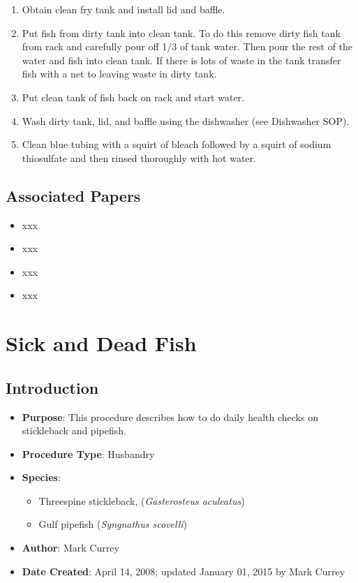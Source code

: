 \documentclass[
  letterpaper,
  DIV=11,
  numbers=noendperiod]{scrreprt}
\providecommand{\tightlist}{%
  \setlength{\itemsep}{0pt}\setlength{\parskip}{0pt}}\usepackage{longtable,booktabs,array}
\begin{document}
\begin{enumerate}
\def\labelenumi{\arabic{enumi}.}
\tightlist
\item
  Obtain clean fry tank and install lid and baffle.
\item
  Put fish from dirty tank into clean tank. To do this remove dirty fish
  tank from rack and carefully pour off 1/3 of tank water. Then pour the
  rest of the water and fish into clean tank. If there is lots of waste
  in the tank transfer fish with a net to leaving waste in dirty tank.
\item
  Put clean tank of fish back on rack and start water.
\item
  Wash dirty tank, lid, and baffle using the dishwasher (see Dishwasher
  SOP).
\item
  Clean blue tubing with a squirt of bleach followed by a squirt of
  sodium thiosulfate and then rinsed thoroughly with hot water.
\end{enumerate}

\hypertarget{associated-papers-6}{%
\section{Associated Papers}\label{associated-papers-6}}

\begin{itemize}
\tightlist
\item
  xxx
\item
  xxx
\item
  xxx
\item
  xxx
\end{itemize}

\hypertarget{sec-husbandry-fish_health_check}{%
\chapter{Sick and Dead Fish}\label{sec-husbandry-fish_health_check}}

\hypertarget{introduction-13}{%
\section{Introduction}\label{introduction-13}}

\begin{itemize}
\tightlist
\item
  \textbf{Purpose}: This procedure describes how to do daily health
  checks on stickleback and pipefish.
\item
  \textbf{Procedure Type}: Husbandry
\item
  \textbf{Species}:

  \begin{itemize}
  \tightlist
  \item
    Threespine stickleback, (\emph{Gasterosteus aculeatus})
  \item
    Gulf pipefish (\emph{Syngnathus scovelli})
  \end{itemize}
\item
  \textbf{Author}: Mark Currey
\item
  \textbf{Date Created}: April 14, 2008; updated January 01, 2015 by
  Mark Currey
\end{itemize}
\end{document}
